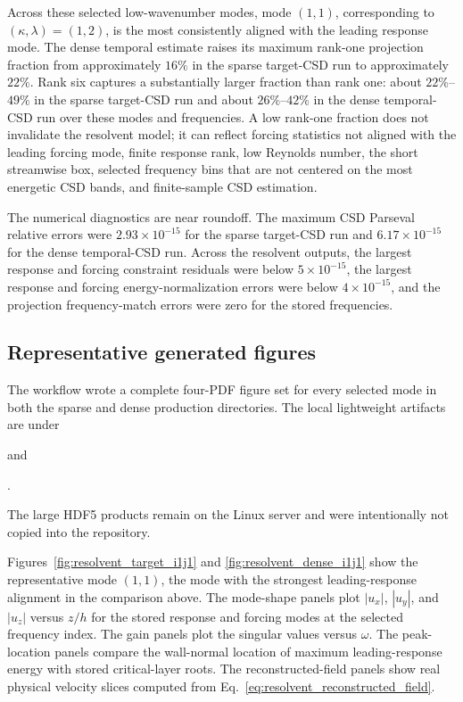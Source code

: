 \documentclass[11pt]{article}
\begin{document}
Across these selected low-wavenumber modes, mode \((1,1)\), corresponding to
\((\kappa,\lambda)=(1,2)\), is the most consistently aligned with the leading
response mode. The dense temporal estimate raises its maximum rank-one
projection fraction from approximately \(16\%\) in the sparse target-CSD run
to approximately \(22\%\). Rank six captures a substantially larger fraction
than rank one: about \(22\%\)--\(49\%\) in the sparse target-CSD run and about
\(26\%\)--\(42\%\) in the dense temporal-CSD run over these modes and
frequencies. A low rank-one fraction does not invalidate the resolvent model;
it can reflect forcing statistics not aligned with the leading forcing mode,
finite response rank, low Reynolds number, the short streamwise box, selected
frequency bins that are not centered on the most energetic CSD bands, and
finite-sample CSD estimation.

The numerical diagnostics are near roundoff. The maximum CSD Parseval relative
errors were \(2.93\times10^{-15}\) for the sparse target-CSD run and
\(6.17\times10^{-15}\) for the dense temporal-CSD run. Across the resolvent
outputs, the largest response and forcing constraint residuals were below
\(5\times10^{-15}\), the largest response and forcing energy-normalization
errors were below \(4\times10^{-15}\), and the projection frequency-match
errors were zero for the stored frequencies.

\subsection{Representative generated figures}

The workflow wrote a complete four-PDF figure set for every selected mode in
both the sparse and dense production directories. The local lightweight
artifacts are under
\begin{center}
\end{center}
and
\begin{center}
  .
\end{center}
The large HDF5 products remain on the Linux server and were intentionally not
copied into the repository.

Figures~\ref{fig:resolvent_target_i1j1} and
\ref{fig:resolvent_dense_i1j1} show the representative mode \((1,1)\), the
mode with the strongest leading-response alignment in the comparison above.
The mode-shape panels plot \(|u_x|\), \(|u_y|\), and \(|u_z|\) versus \(z/h\)
for the stored response and forcing modes at the selected frequency index.
The gain panels plot the singular values versus \(\omega\). The peak-location
panels compare the wall-normal location of maximum leading-response energy
with stored critical-layer roots. The reconstructed-field panels show real
physical velocity slices computed from
Eq.~\eqref{eq:resolvent_reconstructed_field}.
\end{document}
